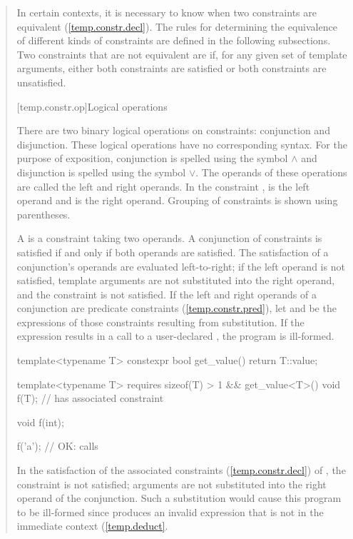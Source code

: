 \begin{quote}
\pnum 
In certain contexts, it is necessary to know when two constraints are equivalent
(\ref{temp.constr.decl}). 
% 
The rules for determining the equivalence of different kinds of
constraints are defined in the following subsections.
% 
Two constraints that are not equivalent are  if,
for any given set of template arguments, either both constraints are satisfied
or both constraints are unsatisfied.


[temp.constr.op]{Logical operations}

\pnum
There are two binary logical operations on constraints: conjunction
and disjunction.
% 
\enternote 
These logical operations have no corresponding \Cpp syntax.
For the purpose of exposition, conjunction is spelled
using the symbol $\land$ and disjunction is spelled using the 
symbol $\lor$. 
% 
The operands of these operations are called the left 
and right operands. In the constraint ,
 is the left operand and  is the right operand.
% 
Grouping of constraints is shown using parentheses.
\exitnote

\pnum
A  is a constraint taking two 
operands. A conjunction of constraints is satisfied if and only 
if both operands are satisfied. 
% 
The satisfaction of a conjunction's operands are evaluated left-to-right; 
if the left operand is not satisfied, template arguments are not 
substituted into the right operand, and the constraint is not satisfied.
% 
If the left and right operands of a conjunction are predicate constraints
(\ref{temp.constr.pred}), let  and  be the expressions
of those constraints resulting from substitution. If the expression
 results in a call to a user-declared ,
the program is ill-formed.
% 
\enterexample
\begin{codeblock}
template<typename T>
  constexpr bool get_value() { return T::value; }

template<typename T>
  requires sizeof(T) > 1 && get_value<T>()
    void f(T);   // has associated constraint 

void f(int);

f('a'); // OK: calls 
\end{codeblock}
In the satisfaction of the associated constraints (\ref{temp.constr.decl}) 
of , the constraint  is not satisfied; 
arguments are not substituted into the right operand of the conjunction.
% 
Such a substitution would cause this program to be ill-formed since 
 produces an invalid expression that is not in
the immediate context (\ref{temp.deduct}.
\exitexample



\end{quote}
